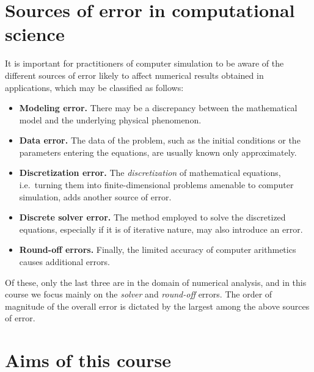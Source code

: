 \section*{Sources of error in computational science}%
\label{sec:sources_of_error}

It is important for practitioners of computer simulation to be aware of the different sources of error likely to affect numerical results obtained in applications,
which may be classified as follows:
\begin{itemize}
    \item
        \textbf{Modeling error.}
        There may be a discrepancy between the mathematical model and the underlying physical phenomenon.

    \item
        \textbf{Data error.}
        The data of the problem,
        such as the initial conditions or the parameters entering the equations,
        are usually known only approximately.

    \item
        \textbf{Discretization error.}
        The \emph{discretization} of mathematical equations,
        i.e.\ turning them into finite-dimensional problems amenable to computer simulation,
        adds another source of error.

    \item
        \textbf{Discrete solver error.}
        The method employed to solve the discretized equations,
        especially if it is of iterative nature,
        may also introduce an error.

    \item
        \textbf{Round-off errors.}
        Finally, the limited accuracy of computer arithmetics causes additional errors.
\end{itemize}
Of these,
only the last three are in the domain of numerical analysis,
and in this course we focus mainly on the \emph{solver} and \emph{round-off} errors.
The order of magnitude of the overall error is dictated by the largest among the above sources of error.

\section*{Aims of this course}%
\label{sec:aims_of_this_course}

